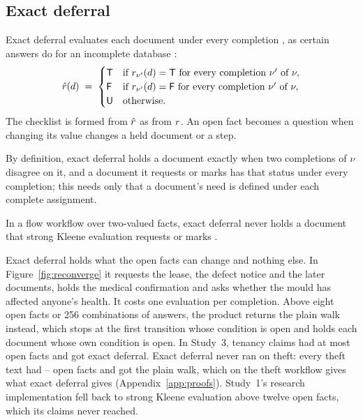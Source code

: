 \subsection{Exact deferral}
\label{sec:exact}

Exact deferral evaluates each document under every completion \cite{vanfraassen1966singular}, as certain answers do for an incomplete database \cite{imielinski1984incomplete}:
\begin{equation}
\hat r(d) \;=\;
\begin{cases}
\mathsf{T} & \text{if } r_{\nu'}(d)=\mathsf{T} \text{ for every completion } \nu' \text{ of } \nu,\\
\mathsf{F} & \text{if } r_{\nu'}(d)=\mathsf{F} \text{ for every completion } \nu' \text{ of } \nu,\\
\mathsf{U} & \text{otherwise.}
\end{cases}
\label{eq:exact}
\end{equation}
The checklist is formed from $\hat r$ as from $r$. An open fact becomes a question when changing its value changes a held document or a step.

By definition, exact deferral holds a document exactly when two completions of $\nu$ disagree on it, and a document it requests or marks \skipd has that status under every completion; this needs only that a document's need is defined under each complete assignment.

\begin{proposition}
\label{prop:exact}
In a flow workflow over two-valued facts, exact deferral never holds a document that strong Kleene evaluation requests or marks \skipd.
\end{proposition}

Exact deferral holds what the open facts can change and nothing else. In Figure~\ref{fig:reconverge} it requests the lease, the defect notice and the later documents, holds the medical confirmation and asks whether the mould has affected anyone's health. It costs one evaluation per completion. Above eight open facts or 256 combinations of answers, the product returns the plain walk instead, which stops at the first transition whose condition is open and holds each document whose own condition is open. In Study~3, tenancy claims had at most \sthreeDeferralCasePathTenMaxOpen{} open facts and got exact deferral. Exact deferral never ran on theft: every theft text had \sthreeDeferralCasePathThMinOpenPlain--\sthreeDeferralCasePathThMaxOpen{} open facts and got the plain walk, which on the theft workflow gives what exact deferral gives (Appendix~\ref{app:proofs}). Study~1's research implementation fell back to strong Kleene evaluation above twelve open facts, which its claims never reached.

